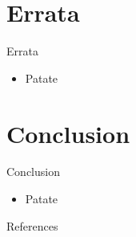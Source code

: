 \documentclass{beamer}
\begin{document}
\section{Errata}

\begin{frame}{Errata}
    \begin{itemize}
        \item  Patate
    \end{itemize}

\end{frame}

\section{Conclusion}

\begin{frame}{Conclusion}
    \begin{itemize}
        \item  Patate
    \end{itemize}

\end{frame}


\begin{frame}[allowframebreaks]{References}
    \printbibliography
\end{frame}
\end{document}
